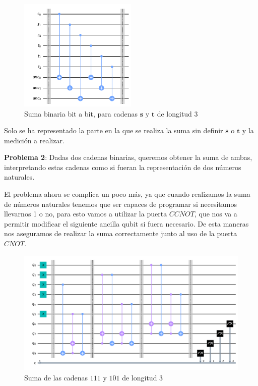  \begin{figure}[H]
    \centering
    \includegraphics[width=0.5\textwidth]{TFG/imagenes/sumaBtB.png}
    \caption{Suma binaria bit a bit, para cadenas $\mathbf{s}$ y $\mathbf{t}$ de longitud 3} 
    \label{FIG:SumaBtB}
 \end{figure}

 Solo se ha representado la parte en la que se realiza la suma sin definir $\mathbf{s}$ o $\mathbf{t}$ y la medición a realizar. \newline

 \textbf{Problema 2}: Dadas dos cadenas binarias, queremos obtener la suma de ambas, interpretando estas cadenas como si fueran la representación de dos números naturales.\newline

 El problema ahora se complica un poco más, ya que cuando realizamos la suma de números naturales tenemos que ser capaces de programar si necesitamos llevarnos 1 o no, para esto vamos a utilizar la puerta $CCNOT$, que nos va a permitir modificar el siguiente ancilla qubit si fuera necesario. De esta maneras nos aseguramos de realizar la suma correctamente junto al uso de la puerta $CNOT$.

\begin{figure}[H]
    \centering
    \includegraphics[width=\textwidth]{TFG/imagenes/sumaNat.png}
    \caption{Suma de las cadenas $111$ y $101$ de longitud 3} 
    \label{FIG:SumaNat}
 \end{figure}

